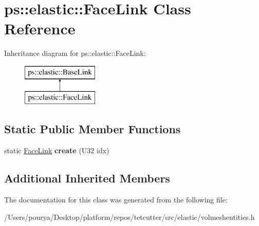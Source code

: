 \hypertarget{classps_1_1elastic_1_1FaceLink}{}\section{ps\+:\+:elastic\+:\+:Face\+Link Class Reference}
\label{classps_1_1elastic_1_1FaceLink}
Inheritance diagram for ps\+:\+:elastic\+:\+:Face\+Link\+:\begin{figure}[H]
\begin{center}
\leavevmode
\includegraphics[height=2.000000cm]{classps_1_1elastic_1_1FaceLink}
\end{center}
\end{figure}
\subsection*{Static Public Member Functions}
\begin{DoxyCompactItemize}
\item 
\hypertarget{classps_1_1elastic_1_1FaceLink_aa38f226864df8220d1e67cb74032dbdb}{}static \hyperlink{classps_1_1elastic_1_1FaceLink}{Face\+Link} {\bfseries create} (U32 idx)\label{classps_1_1elastic_1_1FaceLink_aa38f226864df8220d1e67cb74032dbdb}

\end{DoxyCompactItemize}
\subsection*{Additional Inherited Members}


The documentation for this class was generated from the following file\+:\begin{DoxyCompactItemize}
\item 
/\+Users/pourya/\+Desktop/platform/repos/tetcutter/src/elastic/volmeshentities.\+h\end{DoxyCompactItemize}
